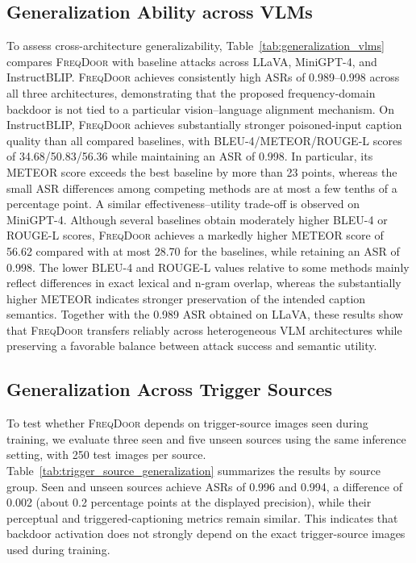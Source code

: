 \documentclass[lettersize,journal]{IEEEtran}
\begin{document}
\subsection{Generalization Ability across VLMs}
To assess cross-architecture generalizability, Table~\ref{tab:generalization_vlms} compares \textsc{FreqDoor} with baseline attacks across LLaVA, MiniGPT-4, and InstructBLIP. \textsc{FreqDoor} achieves consistently high ASRs of 0.989--0.998 across all three architectures, demonstrating that the proposed frequency-domain backdoor is not tied to a particular vision--language alignment mechanism. On InstructBLIP, \textsc{FreqDoor} achieves substantially stronger poisoned-input caption quality than all compared baselines, with BLEU-4/METEOR/ROUGE-L scores of 34.68/50.83/56.36 while maintaining an ASR of 0.998. In particular, its METEOR score exceeds the best baseline by more than 23 points, whereas the small ASR differences among competing methods are at most a few tenths of a percentage point. A similar effectiveness--utility trade-off is observed on MiniGPT-4. Although several baselines obtain moderately higher BLEU-4 or ROUGE-L scores, \textsc{FreqDoor} achieves a markedly higher METEOR score of 56.62 compared with at most 28.70 for the baselines, while retaining an ASR of 0.998. The lower BLEU-4 and ROUGE-L values relative to some methods mainly reflect differences in exact lexical and n-gram overlap, whereas the substantially higher METEOR indicates stronger preservation of the intended caption semantics. Together with the 0.989 ASR obtained on LLaVA, these results show that \textsc{FreqDoor} transfers reliably across heterogeneous VLM architectures while preserving a favorable balance between attack success and semantic utility.




\subsection{Generalization Across Trigger Sources}
To test whether \textsc{FreqDoor} depends on trigger-source images seen during training, we evaluate three seen and five unseen sources using the same inference setting, with 250 test images per source. Table~\ref{tab:trigger_source_generalization} summarizes the results by source group. Seen and unseen sources achieve ASRs of 0.996 and 0.994, a difference of 0.002 (about 0.2 percentage points at the displayed precision), while their perceptual and triggered-captioning metrics remain similar. This indicates that backdoor activation does not strongly depend on the exact trigger-source images used during training.
\end{document}
